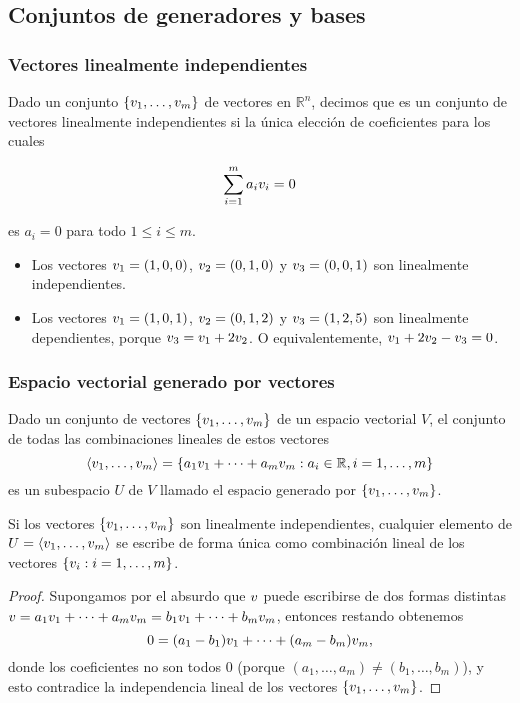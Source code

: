 \subsection{Conjuntos de generadores y bases}

\subsubsection{Vectores linealmente independientes}

Dado un conjunto $\{\vb_1, \dots, \vb_m\}$ de vectores en $\mathbb{R}^n$, decimos que es un conjunto de vectores linealmente independientes si la única elección de coeficientes para los cuales

$$\sum_{i=1}^m a_i \vb_i = 0$$

es $a_i = 0$ para todo $1 \le i \le m$.

\begin{ejemplo}\leavevmode
\begin{itemize}
\item Los vectores $\vb_1 = (1,0,0)$, $\vb_2 = (0, 1, 0)$ y $\vb_3 = (0, 0, 1)$ son linealmente independientes.
\item Los vectores $\vb_1 = (1,0,1)$, $\vb_2 = (0, 1, 2)$ y $\vb_3 = (1, 2, 5)$ son linealmente dependientes, porque $\vb_3 = \vb_1 + 2\vb_2$. O equivalentemente, $\vb_1 + 2\vb_2 - \vb_3 = 0$.
\end{itemize}
\end{ejemplo}

\subsubsection{Espacio vectorial generado por vectores}
Dado un conjunto de vectores $\{\vb_1, \dots, \vb_m\}$ de un espacio vectorial $V$, el conjunto de todas las combinaciones lineales de estos vectores
$$
\langle \vb_1, \dots, \vb_m \rangle = \{a_1 \vb_1 + \dots + a_m \vb_m : a_i \in \mathbb{R}, i = 1, \dots, m\}
$$
es un subespacio $U$ de $V$ llamado el espacio generado por $\{\vb_1, \dots, \vb_m\}$.

\begin{proposicion}
Si los vectores $\{\vb_1, \dots, \vb_m\}$ son linealmente independientes, cualquier elemento de $U = \langle \vb_1, \dots, \vb_m \rangle$ se escribe de forma única como combinación lineal de los vectores $\{\vb_i: i = 1, \dots, m\}$.
\end{proposicion}

\begin{proof}
Supongamos por el absurdo que $\vb$ puede escribirse de dos formas distintas $\vb = a_1 \vb_1 + \dots + a_m \vb_m = b_1 \vb_1 + \dots + b_m \vb_m$, entonces restando obtenemos
$$
0 = (a_1-b_1) \vb_1 + \dots + (a_m-b_m) \vb_m,
$$
donde los coeficientes no son todos 0 (porque $(a_1, \dots, a_m) \neq (b_1, \dots, b_m)$), y esto contradice la independencia lineal de los vectores $\{\vb_1, \dots, \vb_m\}$.
\end{proof}


